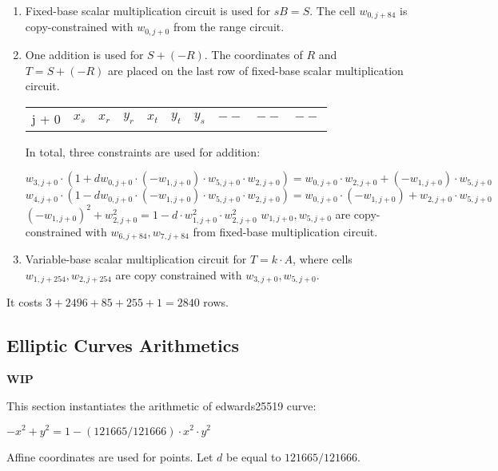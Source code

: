 \begin{enumerate}
        \begin{enumerate}
            \item Fixed-base scalar multiplication circuit is used for $sB = S$. The cell $w_{0, j + 84}$ is copy-constrained with $w_{0, j + 0}$ from the range circuit.
            \item One addition is used for $S + (-R)$. The coordinates of $R$ and $T = S + (-R)$ are placed on the last row of fixed-base scalar multiplication circuit.
                    \begin{center}
    \begin{tabular}{ c|c|c|c|c|c|c|c|c|c }
    j + 0 & $x_s$  & $x_r$ & $y_r$ & $x_t$ & $y_t$ & $y_s$ & $--$ & $--$ & $--$   \\
    \end{tabular}
\end{center}
                In total, three constraints are used for addition:
                \begin{center}
                    $w_{3, j + 0}\cdot (1 + d w_{0, j + 0} \cdot (-w_{1, j + 0}) \cdot w_{5, j + 0} \cdot w_{2, j + 0}) = w_{0, j + 0} \cdot w_{2, j + 0} + (-w_{1, j + 0}) \cdot w_{5, j + 0}$ \\
                    $w_{4, j + 0} \cdot (1 - d w_{0, j + 0} \cdot (-w_{1, j + 0}) \cdot w_{5, j + 0} \cdot w_{2, j + 0}) = w_{0, j + 0} \cdot (-w_{1, j + 0}) + w_{2, j + 0} \cdot w_{5, j + 0}$ \\
                    $(- w_{1, j + 0})^2 + w_{2, j + 0}^2 = 1 - d \cdot w_{1, j + 0}^2 \cdot w_{2, j + 0}^2$
                    $w_{1, j + 0}, w_{5, j + 0}$ are copy-constrained with $w_{6, j + 84}, w_{7, j + 84}$ from fixed-base multiplication circuit.
                \end{center}
            \item Variable-base scalar multiplication circuit for $T = k \cdot A$, where cells $w_{1, j + 254}, w_{2, j + 254}$ are copy constrained with $w_{3, j + 0}, w _{5, j + 0}$.
        \end{enumerate}
\end{enumerate}
It costs $3 + 2496 + 85 + 255 + 1 = 2840$ rows.
\subsection{Elliptic Curves Arithmetics}
\label{ellcurve}
\textbf{WIP}

This section instantiates the arithmetic of edwards25519 curve:
\begin{center}
    $- x^2 + y^2 = 1 - (121665/121666) \cdot x^2 \cdot y^2$
\end{center}
Affine coordinates are used for points.
Let $d$ be equal to $121665/121666$.

